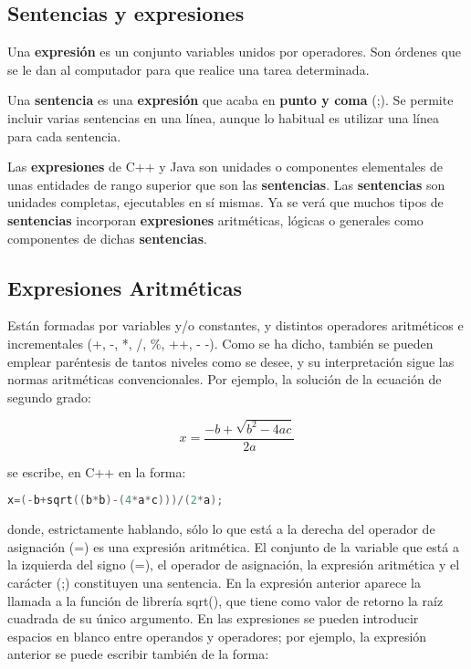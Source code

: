 \subsection{Sentencias y expresiones}

Una \textbf{expresión} es un conjunto variables unidos por operadores. Son órdenes que se le dan al
computador para que realice una tarea determinada.

Una \textbf{sentencia} es una \textbf{expresión} que acaba en \textbf{punto y coma} (;). Se permite incluir varias sentencias en una línea, aunque lo habitual es utilizar una línea para cada sentencia.

Las \textbf{expresiones} de C++ y Java son unidades o componentes elementales de unas entidades de rango
superior que son las \textbf{sentencias}. Las \textbf{sentencias} son unidades completas, ejecutables en sí
mismas. Ya se verá que muchos tipos de \textbf{sentencias} incorporan \textbf{expresiones} aritméticas,
lógicas o generales como componentes de dichas \textbf{sentencias}.

\subsection{Expresiones Aritméticas}

Están formadas por variables y/o constantes, y distintos operadores aritméticos e
incrementales (+, -, *, /, \%, ++, - -). Como se ha dicho, también se pueden emplear paréntesis de tantos niveles como se desee, y su interpretación sigue las normas
aritméticas convencionales. Por ejemplo, la solución de la ecuación de segundo grado:

$$ x = \frac{-b+\sqrt{b^2-4ac}}{2a} $$

se escribe, en C++ en la forma:
\begin{lstlisting}[language=C++]
x=(-b+sqrt((b*b)-(4*a*c)))/(2*a);
\end{lstlisting}

donde, estrictamente hablando, sólo lo que está a la derecha del operador de asignación (=) es
una expresión aritmética. El conjunto de la variable que está a la izquierda del signo (=), el
operador de asignación, la expresión aritmética y el carácter (;) constituyen una sentencia. En
la expresión anterior aparece la llamada a la función de librería sqrt(), que tiene como valor
de retorno la raíz cuadrada de su único argumento. En las expresiones se pueden introducir
espacios en blanco entre operandos y operadores; por ejemplo, la expresión anterior se puede
escribir también de la forma:

